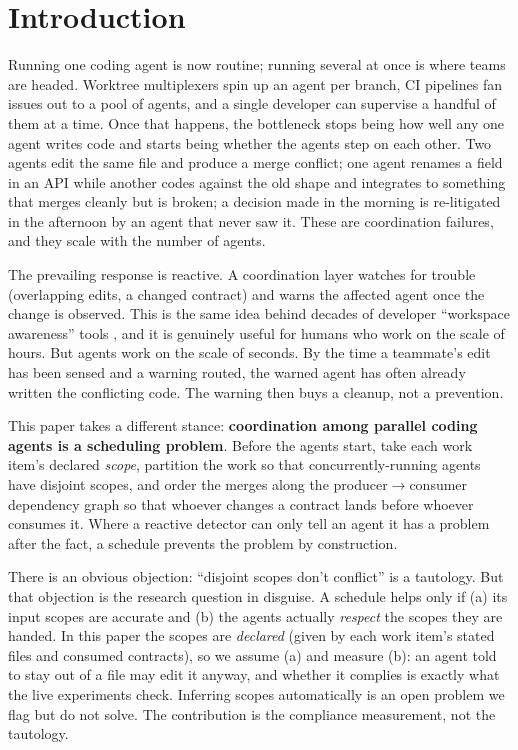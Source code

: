 \section{Introduction}

Running one coding agent is now routine; running several at once is where teams are headed.
Worktree multiplexers spin up an agent per branch, CI pipelines fan issues out to a pool of
agents, and a single developer can supervise a handful of them at a time. Once that happens, the
bottleneck stops being how well any one agent writes code and starts being whether the agents step
on each other. Two agents edit the same file and produce a merge conflict; one agent renames a
field in an API while another codes against the old shape and integrates to something that merges
cleanly but is broken; a decision made in the morning is re-litigated in the afternoon by an agent
that never saw it. These are coordination failures, and they scale with the number of agents.

The prevailing response is reactive. A coordination layer watches for trouble (overlapping
edits, a changed contract) and warns the affected agent once the change is observed. This is the
same idea behind decades of developer ``workspace awareness'' tools \citep{brun2011proactive}, and
it is genuinely useful for humans who work on the scale of hours. But agents work on the scale of
seconds. By the time a teammate's edit has been sensed and a warning routed, the warned agent has
often already written the conflicting code. The warning then buys a cleanup, not a prevention.

This paper takes a different stance: \textbf{coordination among parallel coding agents is a
scheduling problem}. Before the agents start, take each work item's declared \emph{scope}, partition
the work so that concurrently-running agents have disjoint scopes, and order the merges along the
producer$\rightarrow$consumer dependency graph so that whoever changes a contract lands before
whoever consumes it. Where a reactive detector can only tell an agent it has a problem after the
fact, a schedule prevents the problem by construction.

There is an obvious objection: ``disjoint scopes don't conflict'' is a tautology. But that
objection is the research question in disguise. A schedule helps only if (a) its input scopes are
accurate and (b) the agents actually \emph{respect} the scopes they are handed. In this paper the
scopes are \emph{declared} (given by each work item's stated files and consumed contracts), so we
assume (a) and measure (b): an agent told to stay out of a file may edit it anyway, and whether it
complies is exactly what the live experiments check. Inferring scopes automatically is an open
problem we flag but do not solve. The contribution is the compliance measurement, not the tautology.

